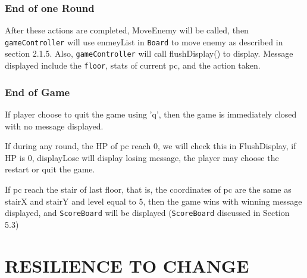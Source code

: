\documentclass[11pt]{article}
\theoremstyle{plain} \newtheorem{theorem*}{Theorem}[subsection]
\begin{document}
\subsubsection{End of one Round}

After these actions are completed, \textsf{MoveEnemy} will be called,
then \texttt{gameController} will use \textsf{enmeyList} in \texttt{Board}
to move enemy as described in section 2.1.5. Also, \texttt{gameController}
will call \textsf{flushDisplay()} to display. Message displayed include
the \texttt{floor}, stats of current \textsf{pc}, and the action taken.\\

\subsubsection{End of Game}

If player choose to quit the game using 'q', then the game is immediately 
closed with no message displayed.

If during any round, the HP of \textsf{pc} reach 0, we will check this
in \textsf{FlushDisplay}, if HP is 0, \textsf{displayLose} will display
losing message, the player may choose the restart or quit the game.

If \textsf{pc} reach the stair of last floor, that is, the coordinates of
\textsf{pc} are the same as \textsf{stairX} and \textsf{stairY} and 
\textsf{level} equal to 5, then the game wins with winning message displayed,
and \texttt{ScoreBoard} will be displayed (\texttt{ScoreBoard} discussed in
Section 5.3)













\newpage
\section{RESILIENCE TO CHANGE}
\end{document}
